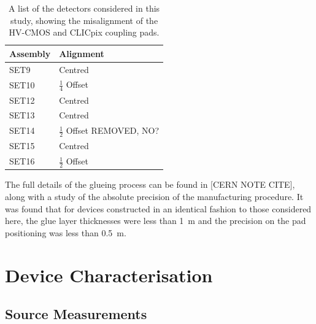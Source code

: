 \begin{table}[h!]
\centering
\begin{tabular}{ l l }
\hline
Assembly & Alignment \\ 
\hline
SET9 & Centred \\
SET10 & $\frac{1}{4}$ Offset \\
SET12 & Centred \\
SET13 & Centred \\
SET14 & $\frac{1}{2}$ Offset REMOVED, NO?\\
SET15 & Centred \\
SET16 & $\frac{1}{2}$ Offset \\
\hline
\end{tabular}
\caption[A list of the detectors considered in this study, showing the misalignment of the HV-CMOS and CLICpix coupling pads.]{A list of the detectors considered in this study, showing the misalignment of the HV-CMOS and CLICpix coupling pads.}
\label{table:alignment}
\end{table}


The full details of the glueing process can be found in [CERN NOTE CITE], along with a study of the absolute precision of the manufacturing procedure.  It was found that for devices constructed in an identical fashion to those considered here, the glue layer thicknesses were less than 1~{\mu}m and the precision on the pad positioning was less than 0.5~{\mu}m.  


\section{Device Characterisation}


\subsection{Source Measurements}


